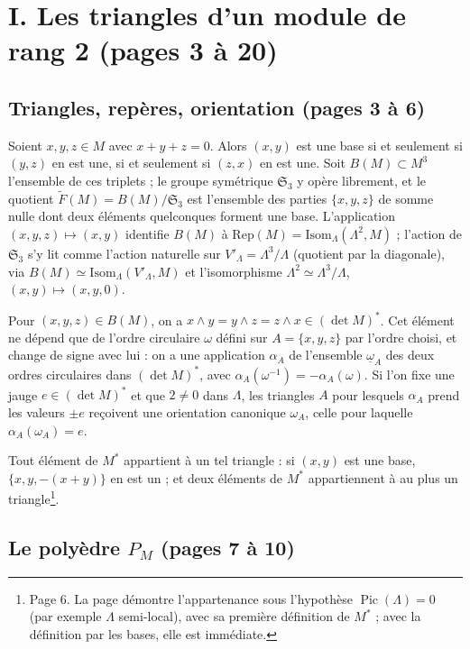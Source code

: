 \documentclass[11pt,a4paper]{article}
\begin{document}
\section*{I. Les triangles d'un module de rang 2 (pages 3 à 20)}

\subsection*{Triangles, repères, orientation (pages 3 à 6)}

Soient $x, y, z \in M$ avec $x + y + z = 0$. Alors $(x, y)$ est une base si et
seulement si $(y, z)$ en est une, si et seulement si $(z, x)$ en est une. Soit
$B(M) \subset M^3$ l'ensemble de ces triplets ; le groupe symétrique
$\mathfrak{S}_3$ y opère librement, et le quotient $\widetilde{F}(M) =
B(M)/\mathfrak{S}_3$ est l'ensemble des parties $\{x, y, z\}$ de somme nulle
dont deux éléments quelconques forment une base. L'application $(x, y, z)
\mapsto (x, y)$ identifie $B(M)$ à $\mathrm{Rep}(M) =
\mathrm{Isom}_\Lambda(\Lambda^2, M)$ ; l'action de $\mathfrak{S}_3$ s'y lit
comme l'action naturelle sur $V'_\Lambda = \Lambda^3/\Lambda$ (quotient par la
diagonale), via $B(M) \simeq \mathrm{Isom}_\Lambda(V'_\Lambda, M)$ et
l'isomorphisme $\Lambda^2 \simeq \Lambda^3/\Lambda$, $(x, y) \mapsto (x, y, 0)$.

Pour $(x, y, z) \in B(M)$, on a $x \wedge y = y \wedge z = z \wedge x \in (\det
M)^{*}$. Cet élément ne dépend que de l'ordre circulaire $\omega$ défini sur $A
= \{x, y, z\}$ par l'ordre choisi, et change de signe avec lui : on a une
application $\alpha_A$ de l'ensemble $\underline{\omega}_A$ des deux ordres
circulaires dans $(\det M)^{*}$, avec $\alpha_A(\omega^{-1}) =
-\alpha_A(\omega)$. Si l'on fixe une jauge $e \in (\det M)^{*}$ et que $2 \neq
0$ dans $\Lambda$, les triangles $A$ pour lesquels $\alpha_A$ prend les
valeurs $\pm e$ reçoivent une orientation canonique $\omega_A$, celle pour
laquelle $\alpha_A(\omega_A) = e$.

Tout élément de $M^{*}$ appartient à un tel triangle : si $(x, y)$ est une
base, $\{x, y, -(x+y)\}$ en est un ; et deux éléments de $M^{*}$ appartiennent à
au plus un triangle\footnote{Page 6. La page démontre l'appartenance sous
l'hypothèse $\operatorname{Pic}(\Lambda) = 0$ (par exemple $\Lambda$
semi-local), avec sa première définition de $M^{*}$ ; avec la définition par
les bases, elle est immédiate.}.

\subsection*{Le polyèdre $P_M$ (pages 7 à 10)}
\end{document}

